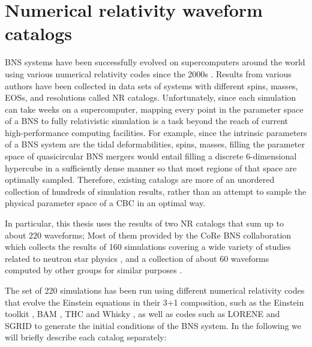 \newpage
\section{Numerical relativity waveform catalogs}\label{NR}

BNS systems have been successfully evolved on supercomputers around the world using various numerical relativity codes since the 2000s \cite{Shibata:1999hn,Shibata:1999wm,Shibata:2019wef}. Results from various authors have been collected in data sets of systems with different spins, masses, EOSs, and resolutions called NR catalogs. Unfortunately, since each simulation can take weeks on a supercomputer, mapping every point in the parameter space of a BNS to fully relativistic simulation is a task beyond the reach of current high-performance computing facilities. For example, since the intrinsic parameters of a BNS system are the tidal deformabilities, spins, masses, filling the parameter space of quasicircular BNS mergers would entail filling a discrete 6-dimensional hypercube in a sufficiently dense manner so that most regions of that space are optimally sampled. Therefore, existing catalogs are more of an unordered collection of hundreds of simulation results, rather than an attempt to sample the physical parameter space of a CBC in an optimal way. 


In particular, this thesis uses the results of two NR catalogs that sum up to about $220$ waveforms; Most of them provided by the CoRe BNS collaboration \cite{Dietrich:2018phi} which collects the results of 160 simulations covering a wide variety of studies related to neutron star physics \cite{Bernuzzi:2014kca,Dietrich:2016hky,Bernuzzi:2016pie,Dietrich:2017aum, Dietrich:2016lyp,Dietrich:2015pxa,Dietrich:2017xqb,Radice:2017zta,Bernuzzi:2014owa,Dietrich:2015iva,Bernuzzi:2015rla, Radice:2016gym,Radice:2016rys,Radice:2017lry,Dietrich:2017feu, Zappa:2017xba}, and a collection of about 60 waveforms computed by other groups for similar purposes \cite{Maione:2016zqz, Kastaun:2016elu,Maione:2017aux,Ciolfi:2017uak,Feo:2016cbs, Kawamura:2016nmk,DePietri:2015lya,DePietri:2018tpx}.

The set of 220 simulations has been run using different numerical relativity codes that evolve the Einstein equations in their 3+1 composition, such as the Einstein toolkit \cite{Loffler:2011ay,Mosta:2013gwu}, BAM \cite{PhysRevLett.92.211101,PhysRevD.77.024027,Thierfelder:2011yi}, THC \cite{Radice_2012} and Whisky \cite{Baiotti:2003btu,Giacomazzo:2007ti}, as well as codes such as LORENE \cite{lorene} and SGRID \cite{Tichy_2009,Tichy_2012,Dietrich_2015} to generate the initial conditions of the BNS system.  In the following we will briefly describe each catalog separately:


